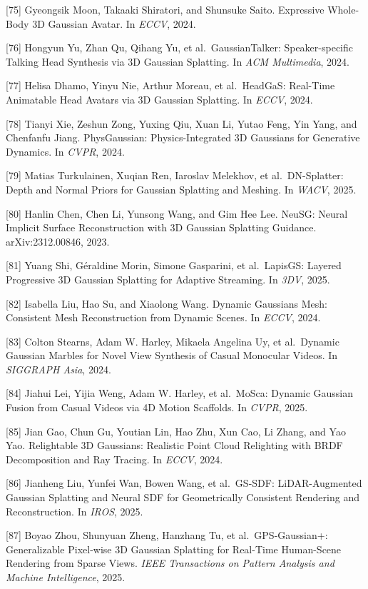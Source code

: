 {[}75{]} Gyeongsik Moon, Takaaki Shiratori, and Shunsuke Saito. Expressive Whole-Body 3D Gaussian Avatar. In \emph{ECCV}, 2024.

{[}76{]} Hongyun Yu, Zhan Qu, Qihang Yu, et al.~GaussianTalker: Speaker-specific Talking Head Synthesis via 3D Gaussian Splatting. In \emph{ACM Multimedia}, 2024.

{[}77{]} Helisa Dhamo, Yinyu Nie, Arthur Moreau, et al.~HeadGaS: Real-Time Animatable Head Avatars via 3D Gaussian Splatting. In \emph{ECCV}, 2024.

{[}78{]} Tianyi Xie, Zeshun Zong, Yuxing Qiu, Xuan Li, Yutao Feng, Yin Yang, and Chenfanfu Jiang. PhysGaussian: Physics-Integrated 3D Gaussians for Generative Dynamics. In \emph{CVPR}, 2024.

{[}79{]} Matias Turkulainen, Xuqian Ren, Iaroslav Melekhov, et al.~DN-Splatter: Depth and Normal Priors for Gaussian Splatting and Meshing. In \emph{WACV}, 2025.

{[}80{]} Hanlin Chen, Chen Li, Yunsong Wang, and Gim Hee Lee. NeuSG: Neural Implicit Surface Reconstruction with 3D Gaussian Splatting Guidance. arXiv:2312.00846, 2023.

{[}81{]} Yuang Shi, Géraldine Morin, Simone Gasparini, et al.~LapisGS: Layered Progressive 3D Gaussian Splatting for Adaptive Streaming. In \emph{3DV}, 2025.

{[}82{]} Isabella Liu, Hao Su, and Xiaolong Wang. Dynamic Gaussians Mesh: Consistent Mesh Reconstruction from Dynamic Scenes. In \emph{ECCV}, 2024.

{[}83{]} Colton Stearns, Adam W. Harley, Mikaela Angelina Uy, et al.~Dynamic Gaussian Marbles for Novel View Synthesis of Casual Monocular Videos. In \emph{SIGGRAPH Asia}, 2024.

{[}84{]} Jiahui Lei, Yijia Weng, Adam W. Harley, et al.~MoSca: Dynamic Gaussian Fusion from Casual Videos via 4D Motion Scaffolds. In \emph{CVPR}, 2025.

{[}85{]} Jian Gao, Chun Gu, Youtian Lin, Hao Zhu, Xun Cao, Li Zhang, and Yao Yao. Relightable 3D Gaussians: Realistic Point Cloud Relighting with BRDF Decomposition and Ray Tracing. In \emph{ECCV}, 2024.

{[}86{]} Jianheng Liu, Yunfei Wan, Bowen Wang, et al.~GS-SDF: LiDAR-Augmented Gaussian Splatting and Neural SDF for Geometrically Consistent Rendering and Reconstruction. In \emph{IROS}, 2025.

{[}87{]} Boyao Zhou, Shunyuan Zheng, Hanzhang Tu, et al.~GPS-Gaussian+: Generalizable Pixel-wise 3D Gaussian Splatting for Real-Time Human-Scene Rendering from Sparse Views. \emph{IEEE Transactions on Pattern Analysis and Machine Intelligence}, 2025.

